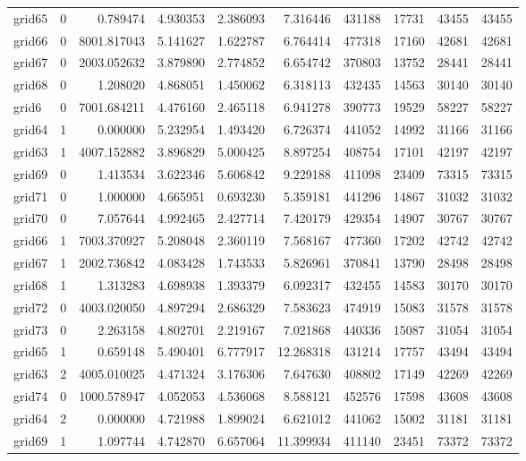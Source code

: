 \begin{longtable}{|l|r|r|r|r|r|r|r|r|r|}
grid65 & 0 & 0.789474 & 4.930353 & 2.386093 & 7.316446 & 431188 & 17731 & 43455 & 43455 \\
grid66 & 0 & 8001.817043 & 5.141627 & 1.622787 & 6.764414 & 477318 & 17160 & 42681 & 42681 \\
grid67 & 0 & 2003.052632 & 3.879890 & 2.774852 & 6.654742 & 370803 & 13752 & 28441 & 28441 \\
grid68 & 0 & 1.208020 & 4.868051 & 1.450062 & 6.318113 & 432435 & 14563 & 30140 & 30140 \\
grid6 & 0 & 7001.684211 & 4.476160 & 2.465118 & 6.941278 & 390773 & 19529 & 58227 & 58227 \\
grid64 & 1 & 0.000000 & 5.232954 & 1.493420 & 6.726374 & 441052 & 14992 & 31166 & 31166 \\
grid63 & 1 & 4007.152882 & 3.896829 & 5.000425 & 8.897254 & 408754 & 17101 & 42197 & 42197 \\
grid69 & 0 & 1.413534 & 3.622346 & 5.606842 & 9.229188 & 411098 & 23409 & 73315 & 73315 \\
grid71 & 0 & 1.000000 & 4.665951 & 0.693230 & 5.359181 & 441296 & 14867 & 31032 & 31032 \\
grid70 & 0 & 7.057644 & 4.992465 & 2.427714 & 7.420179 & 429354 & 14907 & 30767 & 30767 \\
grid66 & 1 & 7003.370927 & 5.208048 & 2.360119 & 7.568167 & 477360 & 17202 & 42742 & 42742 \\
grid67 & 1 & 2002.736842 & 4.083428 & 1.743533 & 5.826961 & 370841 & 13790 & 28498 & 28498 \\
grid68 & 1 & 1.313283 & 4.698938 & 1.393379 & 6.092317 & 432455 & 14583 & 30170 & 30170 \\
grid72 & 0 & 4003.020050 & 4.897294 & 2.686329 & 7.583623 & 474919 & 15083 & 31578 & 31578 \\
grid73 & 0 & 2.263158 & 4.802701 & 2.219167 & 7.021868 & 440336 & 15087 & 31054 & 31054 \\
grid65 & 1 & 0.659148 & 5.490401 & 6.777917 & 12.268318 & 431214 & 17757 & 43494 & 43494 \\
grid63 & 2 & 4005.010025 & 4.471324 & 3.176306 & 7.647630 & 408802 & 17149 & 42269 & 42269 \\
grid74 & 0 & 1000.578947 & 4.052053 & 4.536068 & 8.588121 & 452576 & 17598 & 43608 & 43608 \\
grid64 & 2 & 0.000000 & 4.721988 & 1.899024 & 6.621012 & 441062 & 15002 & 31181 & 31181 \\
grid69 & 1 & 1.097744 & 4.742870 & 6.657064 & 11.399934 & 411140 & 23451 & 73372 & 73372 \\

\end{longtable}
